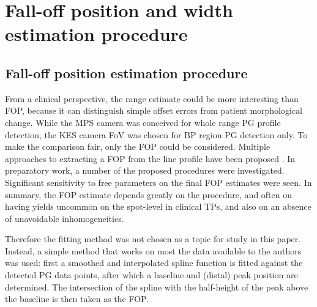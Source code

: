 \documentclass[a4paper,english,12pt]{article}
\begin{document}
\section{Fall-off position and width estimation procedure}\label{sec:fopproc}

\subsection{Fall-off position estimation procedure}

From a clinical perspective, the range estimate could be more interesting than FOP, because it can distinguish simple offset errors from patient morphological change. While the MPS camera was conceived for whole range PG profile detection, the KES camera FoV was chosen for BP region PG detection only. To make the comparison fair, only the FOP could be considered. Multiple approaches to extracting a FOP from the line profile have been proposed \citep{Smeets2012,Gueth2013,Roellinghoff2014a,Janssen2014,Sterpin2015}. In preparatory work, a number of the proposed procedures were investigated. Significant sensitivity to free parameters on the final FOP estimates were seen. In summary, the FOP estimate depends greatly on the procedure, and often on having yields uncommon on the spot-level in clinical TPs, and also on an absence of unavoidable inhomogeneities.

Therefore the fitting method was not chosen as a topic for study in this paper. Instead, a simple method that works on most the data available to the authors was used: first a smoothed and interpolated spline function is fitted against the detected PG data points, after which a baseline and (distal) peak position are determined. The intersection of the spline with the half-height of the peak above the baseline is then taken as the FOP.
\end{document}
